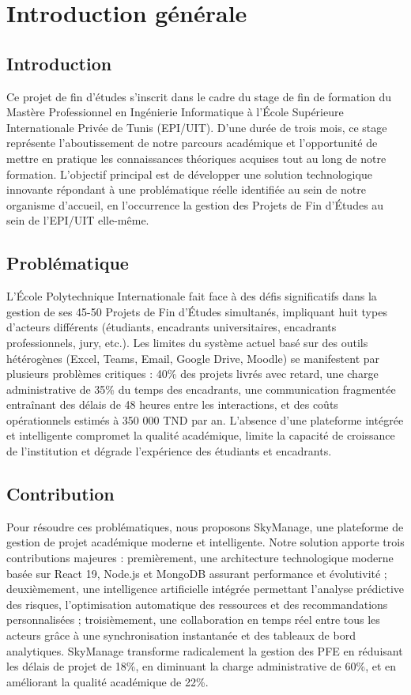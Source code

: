 \chapter*{Introduction générale}

\section*{Introduction}

Ce projet de fin d'études s'inscrit dans le cadre du stage de fin de formation du Mastère Professionnel en Ingénierie Informatique à l'École Supérieure Internationale Privée de Tunis (EPI/UIT). D'une durée de trois mois, ce stage représente l'aboutissement de notre parcours académique et l'opportunité de mettre en pratique les connaissances théoriques acquises tout au long de notre formation. L'objectif principal est de développer une solution technologique innovante répondant à une problématique réelle identifiée au sein de notre organisme d'accueil, en l'occurrence la gestion des Projets de Fin d'Études au sein de l'EPI/UIT elle-même.

\section*{Problématique}

L'École Polytechnique Internationale fait face à des défis significatifs dans la gestion de ses 45-50 Projets de Fin d'Études simultanés, impliquant huit types d'acteurs différents (étudiants, encadrants universitaires, encadrants professionnels, jury, etc.). Les limites du système actuel basé sur des outils hétérogènes (Excel, Teams, Email, Google Drive, Moodle) se manifestent par plusieurs problèmes critiques : 40\% des projets livrés avec retard, une charge administrative de 35\% du temps des encadrants, une communication fragmentée entraînant des délais de 48 heures entre les interactions, et des coûts opérationnels estimés à 350 000 TND par an. L'absence d'une plateforme intégrée et intelligente compromet la qualité académique, limite la capacité de croissance de l'institution et dégrade l'expérience des étudiants et encadrants.

\section*{Contribution}

Pour résoudre ces problématiques, nous proposons SkyManage, une plateforme de gestion de projet académique moderne et intelligente. Notre solution apporte trois contributions majeures : premièrement, une architecture technologique moderne basée sur React 19, Node.js et MongoDB assurant performance et évolutivité ; deuxièmement, une intelligence artificielle intégrée permettant l'analyse prédictive des risques, l'optimisation automatique des ressources et des recommandations personnalisées ; troisièmement, une collaboration en temps réel entre tous les acteurs grâce à une synchronisation instantanée et des tableaux de bord analytiques. SkyManage transforme radicalement la gestion des PFE en réduisant les délais de projet de 18\%, en diminuant la charge administrative de 60\%, et en améliorant la qualité académique de 22\%.


